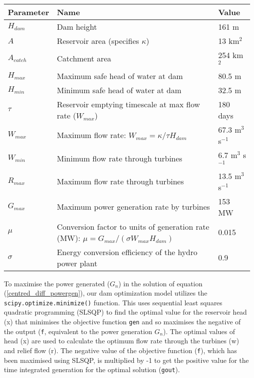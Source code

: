 \documentclass[11pt]{article}
\begin{document}
\begin{center}
        \begin{tabular}{|p{3cm}|p{6cm}|p{4cm}|} %
            \hline
            Parameter & Name & Value \\ \hline %
            $H_{dam}$ & Dam height & 161 m \\ \hline %
            $A$ & Reservoir area (specifies $\kappa$) & 13 km$^2$ \\ \hline %
            $A_{catch}$ & Catchment area & 254 km$^2$ \\ \hline %
            $H_{max}$ & Maximum safe head of water at dam & 80.5 m \\ \hline %
            $H_{min}$ & Minimum safe head of water at dam & 32.5 m \\ \hline %
            $\tau$ & Reservoir emptying timescale at max flow rate ($W_{max}$) & 180 days \\ \hline %
            $W_{max}$ & Maximum flow rate: $W_{max} = \kappa/\tau H_{dam}$ & 67.3 m$^3$ s$^{-1}$ \\ \hline %
            $W_{min}$ & Minimum flow rate through turbines & 6.7 m$^3$ s$^{-1}$ \\ \hline %
            $R_{max}$ & Maximum flow rate through turbines & 13.5 m$^3$ s$^{-1}$  \\ \hline %
            $G_{max}$ & Maximum power generation rate by turbines & 153 MW \\ \hline %
            $\mu$ & Conversion factor to units of generation rate (MW): $\mu = G_{max}/(\sigma W_{max} H_{dam})$ & 0.015  \\ \hline %
            $\sigma$ & Energy conversion efficiency of the hydro power plant & 0.9 \\ \hline %
        \end{tabular}
\end{center}

To maximise the power generated ($G_n$) in the solution of equation (\ref{centred_diff_powergen}), our dam optimization model utilizes the \texttt{scipy.optimize.minimize()} function. This uses sequential least squares quadratic programming (SLSQP) to find the optimal value for the reservoir head (x) that minimises the objective function \texttt{gen} and so maximises the negative of the output (\texttt{f}, equivalent to the power generation $G_n$). The optimal values of head (x) are used to calculate the optimum flow rate through the turbines (w) and relief flow (r). The negative value of the objective function (\texttt{f}), which has been maximised using SLSQP, is multiplied by -1 to get the positive value for the time integrated generation for the optimal solution (\texttt{gout}).\\
\end{document}
